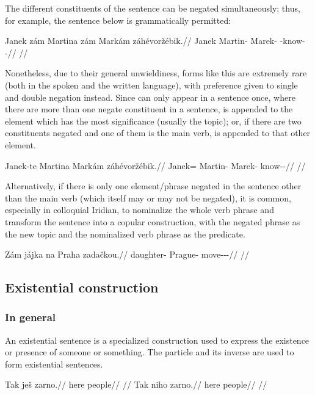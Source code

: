 The different constituents of the sentence can be negated simultaneously; thus,
for example, the sentence below is grammatically permitted:

\pex
\begingl
     Janek {zám} Martina {zám} Markám {zá}hévoržébik.//
    \glb \Neg{} Janek \Neg{} Martin-\Acc{} \Neg{} Marek-\Agt{} \Neg{}-know-\Ben{}-\Pf{}//
    \glft {}//
\endgl
\xe

Nonetheless, due to their general unwieldiness, forms like this are extremely
rare (both in the spoken and the written language), with preference given to
single and double negation instead. Since  can only appear in a
sentence once, where there are more than one negate constituent in a sentence,
 is appended to the element which has the most significance (usually
the topic); or, if there are two constituents negated and one of them is the
main verb,  is appended to that other element.

\pex
\begingl
     Janek{-te} Martina Markám {zá}hévoržébik.//
    \glb \Neg{} Janek=\Foc{} Martin-\Acc{} Marek-\Agt{} \Neg{}know-\Ben{}-\Pf{}//
    \glft {}//
\endgl
\xe

Alternatively, if there is only one element/phrase negated in the sentence other
than the main verb (which itself may or may not be negated), it is common,
especially in colloquial Iridian, to
nominalize the whole verb phrase and transform the
sentence into a copular construction, with the
negated phrase as the new topic and the nominalized verb phrase as
the predicate.

\pex
\begingl
    \gla Zám jájka na Praha zadačkou.//
    \glb \Neg{} daughter-\Dim{} \Loc{} Prague-\Acc{} move-\Av{}-\Pf{}-\Nz{}//
    \glft {}//
\endgl
\xe




\subsection{Existential construction}
\label{sec:exst}

\subsubsection{In general}
An existential sentence is a specialized construction used to express the
existence or presence of someone or something. The particle  and its
inverse  are used to form existential sentences. 
\begin{multicols}{2}
\pex
\a\begingl
\gla Tak ješ zarno.//
\glb here \Exst{} people//
\glft {}//
\endgl
\a\begingl
\gla Tak niho zarno.//
\glb here \N{}\Exst{} people//
\glft {}//
\endgl
\xe
\end{multicols}

